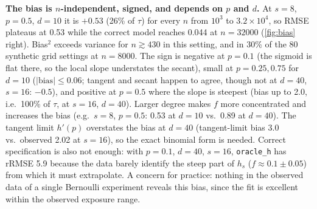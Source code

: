 \documentclass{article}
\theoremstyle{plain}
\theoremstyle{remark}
\begin{document}
\textbf{The bias is $n$-independent, signed, and depends on $p$ and $d$.} At $s=8$, $p=0.5$, $d=10$ it is $+0.53$ (26\% of $\tau$) for every $n$ from $10^3$ to $3.2\times10^4$, so RMSE plateaus at 0.53 while the correct model reaches 0.044 at $n=32000$ (\cref{fig:bias} right). Bias$^2$ exceeds variance for $n\gtrsim430$ in this setting, and in 30\% of the 80 synthetic grid settings at $n=8000$. The sign is negative at $p=0.1$ (the sigmoid is flat there, so the local slope understates the secant), small at $p=0.25,0.75$ for $d=10$ ($|\text{bias}|\le0.06$; tangent and secant happen to agree, though not at $d=40$, $s=16$: $-0.5$), and positive at $p=0.5$ where the slope is steepest (bias up to 2.0, i.e.\ 100\% of $\tau$, at $s=16$, $d=40$). Larger degree makes $f$ more concentrated and increases the bias (e.g.\ $s=8$, $p=0.5$: 0.53 at $d=10$ vs.\ 0.89 at $d=40$). The tangent limit $h'(p)$ overstates the bias at $d=40$ (tangent-limit bias 3.0 vs.\ observed 2.02 at $s=16$), so the exact binomial form is needed. Correct specification is also not enough: with $p=0.1$, $d=40$, $s=16$, \texttt{oracle\_h} has rRMSE 5.9 because the data barely identify the steep part of $h_s$ ($f\approx0.1\pm0.05$) from which it must extrapolate. A concern for practice: nothing in the observed data of a single Bernoulli experiment reveals this bias, since the fit is excellent within the observed exposure range.
\end{document}
